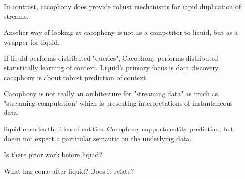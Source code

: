 In contrast, cacophony does provide robust mechanisms for rapid duplication of
streams.  

Another way of looking at cacophony is not as a competitor to liquid, but as a
wrapper for liquid. 

If liquid performs distributed "queries", Cacophony performs distributed
statistically learning of context.  Liquid's primary focus is data discovery,
cacophony is about robust prediction of context.

Cacophony is not really an architecture for "streaming data" as much as
"streaming computation" which is presenting interpretations of instantaneous
data.

liquid encodes the idea of entities.  Cacophony supports entity prediction, but
doesn not expect a particular semantic on the underlying data.



Is there prior work before liquid?

What has come after liquid?  Does it relate?
\cite{Hong2004}

